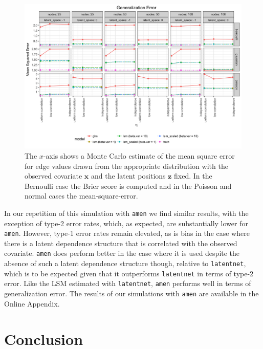 \documentclass[11pt]{article}
\begin{document}
\begin{figure}
\includegraphics[width=\textwidth]{figures/generalization.png}
\caption{The $x$-axis shows a Monte Carlo estimate of the mean square error for edge values drawn from the appropriate distribution with the observed covariate $\mathbf{x}$ and the latent positions $\mathbf{z}$ fixed. In the Bernoulli case the Brier score is computed and in the Poisson and normal cases the mean-square-error. \label{fig:generalization}}
\end{figure}

In our repetition of this simulation with \texttt{amen} we find similar results, with the exception of type-2 error rates, which, as expected, are substantially lower for \texttt{amen}. However, type-1 error rates remain elevated, as is bias in the case where there is a latent dependence structure that is correlated with the observed covariate. \texttt{amen} does perform better in the case where it is used despite the absence of such a latent dependence structure though, relative to \texttt{latentnet}, which is to be expected given that it outperforms \texttt{latentnet} in terms of type-2 error. Like the LSM estimated with \texttt{latentnet}, \texttt{amen} performs well in terms of generalization error. The results of our simulations with \texttt{amen} are available in the Online Appendix.

\section{Conclusion}
\end{document}
